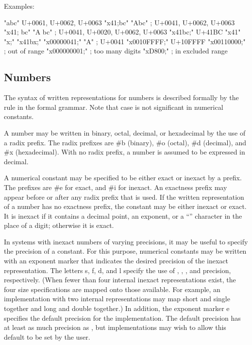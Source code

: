 Examples:

\begin{schemenoindent}
"abc" \ev  \textrm{U+0061, U+0062, U+0063}
"\backwhack{}x41;bc" \ev  "Abc" ; \textrm{U+0041, U+0062, U+0063}
"\backwhack{}x41; bc" \ev "A bc"
\>\>; \textrm{U+0041, U+0020, U+0062, U+0063}
"\backwhack{}x41bc;" \ev  \textrm{U+41BC}
"\backwhack{}x41" \ev {}
"\backwhack{}x;" \ev {}
"\backwhack{}x41bx;" \ev {}
"\backwhack{}x00000041;" \ev  "A" ; \textrm{U+0041}
"\backwhack{}x0010FFFF;" \ev \textrm{U+10FFFF}
"\backwhack{}x00110000;" \ev  {}
\>\>; \textrm{out of range}
"\backwhack{}x000000001;" \ev {}
\>\>; \textrm{too many digits}
"\backwhack{}xD800;" \ev {}
\>\>; \textrm{in excluded range}
\end{schemenoindent}
  
\subsection{Numbers}
\label{numbernotations}

The syntax of written representations for numbers is described
formally by the  rule in the formal grammar.  Note that
case is not significant in numerical constants.

A number may be written in binary, octal, decimal, or
hexadecimal by the use of a radix prefix.  The radix prefixes are {\cf
\#b} (binary), {\cf \#o} (octal), {\cf
\#d} (decimal), and {\cf \#x} (hexadecimal).  With
no radix prefix, a number is assumed to be expressed in decimal.

A
numerical constant may be specified to be either exact or
inexact by a prefix.  The prefixes are {\cf \#e}
for exact, and {\cf \#i} for inexact.  An exactness
prefix may appear before or after any radix prefix that is used.  If
the written representation of a number has no exactness prefix, the
constant may be either inexact or exact.  It is
inexact if it contains a decimal point, an
exponent, or a ``\sharpsign'' character in the place of a digit;
otherwise it is exact.

In systems with inexact numbers
of varying precisions, it may be useful to specify
the precision of a constant.  For this purpose, numerical constants
may be written with an exponent marker that indicates the
desired precision of the inexact
representation.  The letters {\cf s}, {\cf f},
{\cf d}, and {\cf l} specify the use of , ,
, and  precision, respectively.  (When fewer
than four internal
inexact
representations exist, the four size
specifications are mapped onto those available.  For example, an
implementation with two internal representations may map short and
single together and long and double together.)  In addition, the
exponent marker {\cf e} specifies the default precision for the
implementation.  The default precision has at least as much precision
as , but
implementations may wish to allow this default to be set by the user.

